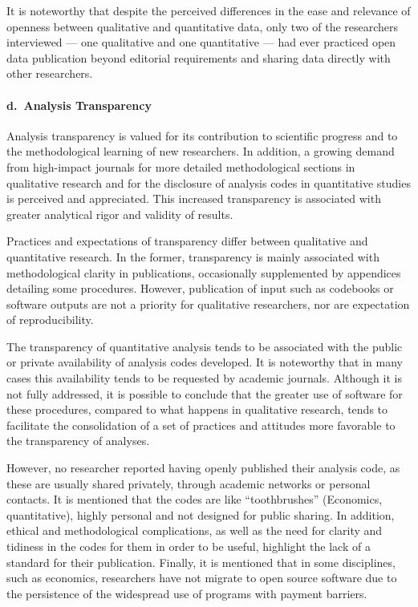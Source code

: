 \documentclass[
  letterpaper,
  DIV=11,
  numbers=noendperiod]{scrartcl}
\let\oldparagraph\paragraph
\renewcommand{\paragraph}[1]{\oldparagraph{#1}\mbox{}}
\begin{document}
It is noteworthy that despite the perceived differences in the ease and
relevance of openness between qualitative and quantitative data, only
two of the researchers interviewed --- one qualitative and one
quantitative --- had ever practiced open data publication beyond
editorial requirements and sharing data directly with other researchers.

\hypertarget{d.-analysis-transparency}{%
\paragraph{d.~Analysis Transparency}\label{d.-analysis-transparency}}

Analysis transparency is valued for its contribution to scientific
progress and to the methodological learning of new researchers. In
addition, a growing demand from high-impact journals for more detailed
methodological sections in qualitative research and for the disclosure
of analysis codes in quantitative studies is perceived and appreciated.
This increased transparency is associated with greater analytical rigor
and validity of results.

Practices and expectations of transparency differ between qualitative
and quantitative research. In the former, transparency is mainly
associated with methodological clarity in publications, occasionally
supplemented by appendices detailing some procedures. However,
publication of input such as codebooks or software outputs are not a
priority for qualitative researchers, nor are expectation of
reproducibility.

The transparency of quantitative analysis tends to be associated with
the public or private availability of analysis codes developed. It is
noteworthy that in many cases this availability tends to be requested by
academic journals. Although it is not fully addressed, it is possible to
conclude that the greater use of software for these procedures, compared
to what happens in qualitative research, tends to facilitate the
consolidation of a set of practices and attitudes more favorable to the
transparency of analyses.

However, no researcher reported having openly published their analysis
code, as these are usually shared privately, through academic networks
or personal contacts. It is mentioned that the codes are like
``toothbrushes'' (Economics, quantitative), highly personal and not
designed for public sharing. In addition, ethical and methodological
complications, as well as the need for clarity and tidiness in the codes
for them in order to be useful, highlight the lack of a standard for
their publication. Finally, it is mentioned that in some disciplines,
such as economics, researchers have not migrate to open source software
due to the persistence of the widespread use of programs with payment
barriers.
\end{document}

